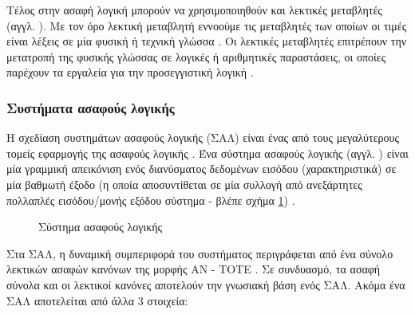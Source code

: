 \documentclass{assignment}
\begin{document}
Τέλος στην ασαφή λογική μπορούν να χρησιμοποιηθούν και λεκτικές μεταβλητές (αγγλ. ). Με τον όρο λεκτική μεταβλητή εννοούμε τις μεταβλητές των οποίων οι τιμές είναι λέξεις σε μία φυσική ή τεχνική γλώσσα \cite{zadeh1975concept}. Οι λεκτικές μεταβλητές επιτρέπουν την μετατροπή της φυσικής γλώσσας σε λογικές ή αριθμητικές παραστάσεις, οι οποίες παρέχουν τα εργαλεία για την προσεγγιστική λογική \cite{engelbrecht}.

\subsubsection*{Συστήματα ασαφούς λογικής}

Η σχεδίαση συστημάτων ασαφούς λογικής (ΣΑΛ) είναι ένας από τους μεγαλύτερους τομείς εφαρμογής της ασαφούς λογικής \cite{engelbrecht}. Ένα σύστημα ασαφούς λογικής (αγγλ. ) είναι μία γραμμική απεικόνιση ενός διανύσματος δεδομένων εισόδου (χαρακτηριστικά) σε μία βαθμωτή έξοδο (η οποία αποσυντίθεται σε μία συλλογή από ανεξάρτητες πολλαπλές εισόδου/μονής εξόδου σύστημα - βλέπε σχήμα \ref{fig:fuzzy_logic_system}) \cite{mendel364485,class_notes}.

\begin{figure}
\begin{center}
\caption{Σύστημα ασαφούς λογικής \cite{mendel364485,class_notes}}
\label{fig:fuzzy_logic_system}
\end{center}
\end{figure}

Στα ΣΑΛ, η δυναμική συμπεριφορά του συστήματος περιγράφεται από ένα σύνολο λεκτικών ασαφών κανόνων της μορφής ΑΝ - ΤΟΤΕ \cite{engelbrecht, class_notes}. Σε συνδυασμό, τα ασαφή σύνολα και οι λεκτικοί κανόνες αποτελούν την γνωσιακή βάση ενός ΣΑΛ. Ακόμα ένα ΣΑΛ αποτελείται από άλλα 3 
στοιχεία:
\end{document}
